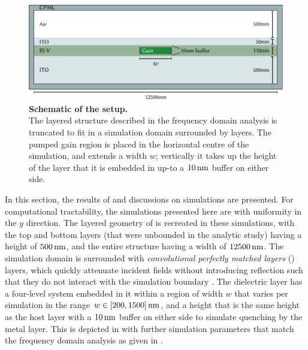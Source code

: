 \begin{figure}
 \includegraphics{figs/sl/FdtdScheme.pdf}
 \caption[Schematic of the \fdtd setup]{\label{fig:FdtdScheme}
\textbf{Schematic of the \fdtd setup.}\small\\
The layered structure described in the frequency domain analysis is truncated to
fit in a simulation domain surrounded by \cpml layers.
The pumped gain region is placed in the horizontal centre of the simulation,
and extends a width $w$; vertically it takes up the height of the \threefive layer
that it is embedded in up-to a $10\operatorname{nm}$ buffer on either side.
}
\end{figure}

In this section, the results of and discussions on \fdtd simulations are
presented.
For computational tractability, the simulations presented here are \twod with
uniformity in the $y$ direction.
The layered geometry of  is recreated in these simulations,
with the top and bottom layers (that were unbounded in the analytic study)
having a height of $500\operatorname{nm}$, and the entire structure having a width of
$12500\operatorname{nm}$.
The simulation domain is surrounded with
\emph{convolutional perfectly matched layers} (\cpml) layers,
which quickly attenuate incident fields without introducing reflection such that
they do not interact with the simulation boundary \cite{Roden2000}.
The dielectric layer has a four-level system embedded in it within a region of
width $w$ that varies per simulation in the range $w \in [200, 1500]\operatorname{nm}$,
and a height that is the same height as the host layer with a $10\operatorname{nm}$ buffer on
either side to simulate quenching by the metal layer.
This is depicted in  with further simulation parameters that
match the frequency domain analysis as given in .

